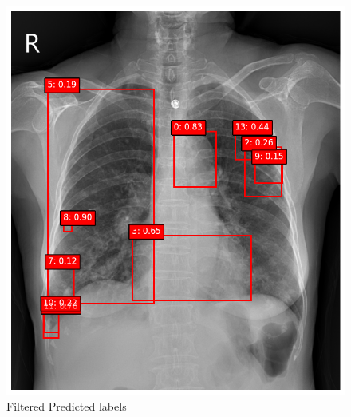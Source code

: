 \documentclass[12pt,oneside]{book} %
\begin{document}
\begin{figure}[H]
\begin{minipage}[b]{0.45\textwidth}
        \includegraphics[width=\textwidth]{../results/predictions_with_filter.png}
        \caption{Filtered Predicted labels}
        \label{fig:predictions_with_filter} %
    \end{minipage}
\end{figure}
\end{document}
